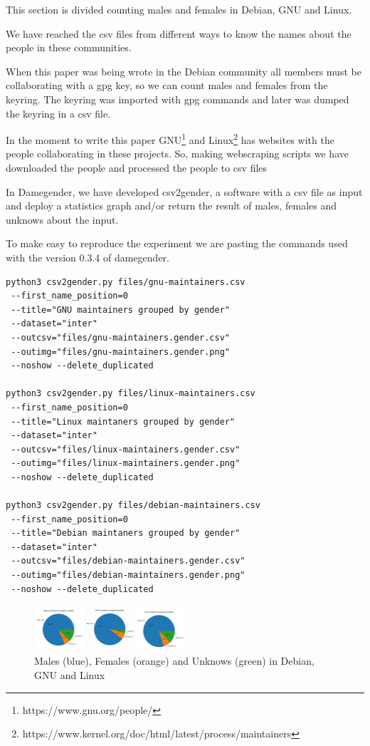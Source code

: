 \documentclass[a4paper]{article}
\begin{document}
This section is divided counting males and females in Debian, GNU and
Linux.

We have reached the csv files from different ways to know the names
about the people in these communities.

When this paper was being wrote in the Debian community all members
must be collaborating with a gpg key, so we can count males and females
from the keyring. The keyring was imported with gpg commands and later
was dumped the keyring in a csv file.

In the moment to write this paper
GNU\footnote{https://www.gnu.org/people/} and
Linux\footnote{https://www.kernel.org/doc/html/latest/process/maintainers}
has websites with the people collaborating in these projects. So,
making webscraping scripts we have downloaded the people and processed
the people to csv files

In Damegender, we have developed csv2gender, a software with a csv
file as input and deploy a statistics graph and/or return the result
of males, females and unknows about the input.

To make easy to reproduce the experiment we are pasting the commands
used with the version 0.3.4 of damegender.

\begin{verbatim}
python3 csv2gender.py files/gnu-maintainers.csv
 --first_name_position=0 
 --title="GNU maintainers grouped by gender"
 --dataset="inter" 
 --outcsv="files/gnu-maintainers.gender.csv"
 --outimg="files/gnu-maintainers.gender.png" 
 --noshow --delete_duplicated

python3 csv2gender.py files/linux-maintainers.csv
 --first_name_position=0 
 --title="Linux maintaners grouped by gender"
 --dataset="inter" 
 --outcsv="files/linux-maintainers.gender.csv"
 --outimg="files/linux-maintainers.gender.png" 
 --noshow --delete_duplicated

python3 csv2gender.py files/debian-maintainers.csv
 --first_name_position=0 
 --title="Debian maintaners grouped by gender"
 --dataset="inter" 
 --outcsv="files/debian-maintainers.gender.csv"
 --outimg="files/debian-maintainers.gender.png" 
 --noshow --delete_duplicated
\end{verbatim}

\begin{figure}
  \centering
  \includegraphics[width=0.6\textwidth]{images/debian-gnu-linux.pdf}     
  \caption[Caption for LOF]{Males (blue), Females (orange) and Unknows (green) in Debian, GNU and Linux}
\end{figure}
\end{document}

